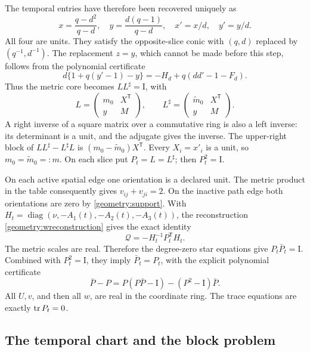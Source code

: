 \documentclass[11pt,a4paper]{article}
\theoremstyle{remark}\newtheorem{remark}[theorem]{Remark}
\newcommand{\Id}{\mathrm I}\newcommand{\F}{\mathbb F}
\begin{document}
The temporal entries have therefore been recovered uniquely as
\begin{equation}\label{geometry:temporal}
 x=\frac{q-d^2}{q-d},\quad
 y=\frac{d(q-1)}{q-d},\quad x'=x/d,\quad y'=y/d.
\end{equation}
All four are units. They satisfy the opposite-slice conic with
\((q,d)\) replaced by \((q^{-1},d^{-1})\).
The replacement \(z=y\), which cannot be made before this step, follows
from the polynomial certificate
\[
 d\{1+q(y'-1)-y\}=-H_d+q(dd'-1-F_d).
\]
Thus the metric core becomes \(LL^\sharp=\Id\), with
\[
 L=\begin{pmatrix}m_0&X^{\mathsf T}\\y&M\end{pmatrix},\qquad
 L^\sharp=\begin{pmatrix}\widetilde m_0&X^{\mathsf T}\\y&M\end{pmatrix}.
\]
A right inverse of a square matrix over a commutative ring is also a left
inverse: its determinant is a unit, and the adjugate gives the inverse.
The upper-right block of \(LL^\sharp-L^\sharp L\) is
\((m_0-\widetilde m_0)X^{\mathsf T}\). Every \(X_i=x'_i\) is a unit,
so \(m_0=\widetilde m_0=:m\). On each slice put \(P_t=L=L^\sharp\);
then \(P_t^2=\Id\).

On each active spatial edge one orientation is a declared unit. The metric
product in the table consequently gives \(v_{ij}+v_{ji}=2\). On the
inactive path edge both orientations are zero by
\eqref{geometry:support}. With
\(H_t=\operatorname{diag}(\nu,-A_1(t),-A_2(t),-A_3(t))\), the
reconstruction \eqref{geometry:wreconstruction} gives the exact identity
\[
 \mathscr Q=-H_t^{-1}P_t^{\mathsf T}H_t.
\]
The metric scales are real. Therefore the degree-zero star equations give
\(P_t\bar P_t=\Id\). Combined with \(P_t^2=\Id\), they imply
\(\bar P_t=P_t\), with the explicit polynomial certificate
\[
 \bar P-P=P(P\bar P-\Id)-(P^2-\Id)\bar P.
\]
All \(U,v\), and then all \(w\), are real in the coordinate ring.
The trace equations are exactly \(\operatorname{tr} P_t=0\).

\subsection{The temporal chart and the block problem}
\end{document}
